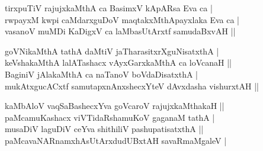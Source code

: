 \begin{entry}
\smallskip
\begin{shl}
tirxpuTiV rajujxkaMthA ca BasimxV kApARsa Eva ca |\\[1pt]
rwpayxM kwpi caMdarxguDoV maqtakxMthApayxlaka Eva ca |\\[1pt]
vasanoV muMDi KaDigxV ca laMbasUtArxtf samudaBxvAH ||
\end{shl}
\medskip
{}
\smallskip
\begin{shl}
goVNikaMthA tathA daMtiV jaTharasitxrXguNisatxthA |\\[1pt]
keVshakaMthA lalATashacx vAyxGarxkaMthA ca loVcanaH ||\\[1pt]
BaginiV jAlakaMthA ca naTanoV boVdaDisatxthA |\\[1pt]
mukAtxgucACxtf samutapxnAnxshecxYteV dAvxdasha vishurxtAH ||
\end{shl}
\medskip
{}
\smallskip
\begin{shl}
kaMbAloV vaqSaBashecxYva goVcaroV rajujxkaMthakaH ||\\[1pt]
paMcamuKashacx viVTidaRshamuKoV gaganaM tathA |\\[1pt]
musaDiV laguDiV ceYva shithiliV pashupatisatxthA ||\\[1pt]
paMcavaNARnamxhAsUtArxdudUBxtAH savaRmaMgaleV |
\end{shl}
\medskip
{}
\end{entry}


